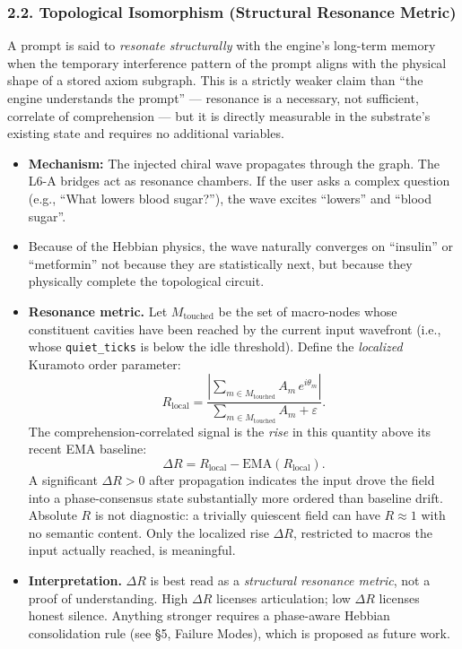 \documentclass[
  11pt,
  a4paper,
]{article}
\providecommand{\tightlist}{%
  \setlength{\itemsep}{0pt}\setlength{\parskip}{0pt}}
\begin{document}
\subsubsection{2.2. Topological Isomorphism (Structural Resonance
Metric)}\label{topological-isomorphism-structural-resonance-metric}

A prompt is said to \emph{resonate structurally} with the engine's
long-term memory when the temporary interference pattern of the prompt
aligns with the physical shape of a stored axiom subgraph. This is a
strictly weaker claim than ``the engine understands the prompt'' ---
resonance is a necessary, not sufficient, correlate of comprehension ---
but it is directly measurable in the substrate's existing state and
requires no additional variables.

\begin{itemize}
\tightlist
\item
  \textbf{Mechanism:} The injected chiral wave propagates through the
  graph. The L6-A bridges act as resonance chambers. If the user asks a
  complex question (e.g., ``What lowers blood sugar?''), the wave
  excites ``lowers'' and ``blood sugar''.
\item
  Because of the Hebbian physics, the wave naturally converges on
  ``insulin'' or ``metformin'' not because they are statistically next,
  but because they physically complete the topological circuit.
\item
  \textbf{Resonance metric.} Let \(M_{\text{touched}}\) be the set of
  macro-nodes whose constituent cavities have been reached by the
  current input wavefront (i.e., whose \texttt{quiet\_ticks} is below
  the idle threshold). Define the \emph{localized} Kuramoto order
  parameter:
  \[ R_{\text{local}} = \frac{\left| \sum_{m \in M_{\text{touched}}} A_m \, e^{i\theta_m} \right|}{\sum_{m \in M_{\text{touched}}} A_m + \varepsilon}. \]
  The comprehension-correlated signal is the \emph{rise} in this
  quantity above its recent EMA baseline:
  \[ \Delta R = R_{\text{local}} - \text{EMA}(R_{\text{local}}). \] A
  significant \(\Delta R > 0\) after propagation indicates the input
  drove the field into a phase-consensus state substantially more
  ordered than baseline drift. Absolute \(R\) is not diagnostic: a
  trivially quiescent field can have \(R \approx 1\) with no semantic
  content. Only the localized rise \(\Delta R\), restricted to macros
  the input actually reached, is meaningful.
\item
  \textbf{Interpretation.} \(\Delta R\) is best read as a
  \emph{structural resonance metric}, not a proof of understanding. High
  \(\Delta R\) licenses articulation; low \(\Delta R\) licenses honest
  silence. Anything stronger requires a phase-aware Hebbian
  consolidation rule (see §5, Failure Modes), which is proposed as
  future work.
\end{itemize}
\end{document}
